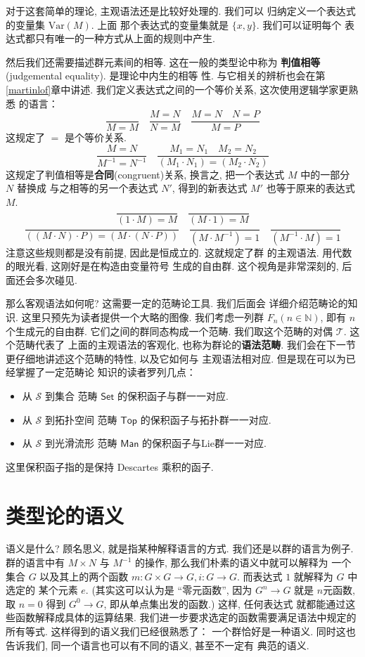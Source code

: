 对于这套简单的理论, 主观语法还是比较好处理的. 我们可以
归纳定义一个表达式的变量集 \(\mathrm{Var}(M)\). 上面
那个表达式的变量集就是 \(\{x, y\}\). 我们可以证明每个
表达式都只有唯一的一种方式从上面的规则中产生.

然后我们还需要描述群元素间的相等. 这在一般的类型论中称为%
\textbf{判值相等}(judgemental equality). 是理论中内生的相等
性. 与它相关的辨析也会在第\ref{martinlof}章中讲述.
我们定义表达式之间的一个等价关系, 这次使用逻辑学家更熟悉
的语言：
\[\frac{}{M = M}\quad
\frac{M = N}{N = M}\quad
\frac{M = N \quad N = P}{M = P}\]
这规定了 \(=\) 是个等价关系.
\[\frac{M = N}{M^{-1} = N^{-1}}\quad
\frac{M_1 = N_1\quad M_2 = N_2}
{(M_1 \cdot N_1) = (M_2 \cdot N_2)}\]
这规定了判值相等是\textbf{合同}(congruent)关系,
换言之, 把一个表达式 \(M\) 中的一部分 \(N\) 替换成
与之相等的另一个表达式 \(N'\), 得到的新表达式 \(M'\)
也等于原来的表达式 \(M\).
\[\frac{}{(1 \cdot M) = M}\quad
\frac{}{(M \cdot 1) = M}\]
\[\frac{}{((M \cdot N) \cdot P)
= (M \cdot (N \cdot P))} \quad
\frac{}{(M \cdot M^{-1}) = 1}\quad
\frac{}{(M^{-1} \cdot M) = 1}\]
注意这些规则都是没有前提, 因此是恒成立的. 这就规定了群
的主观语法. 用代数的眼光看, 这刚好是在构造由变量符号
生成的自由群. 这个视角是非常深刻的, 后面还会多次碰见.

那么客观语法如何呢? 这需要一定的范畴论工具. 我们后面会
详细介绍范畴论的知识. 这里只预先为读者提供一个大略的图像.
我们考虑一列群 \(F_n (n \in \mathbb N)\), 即有
\(n\) 个生成元的自由群. 它们之间的群同态构成一个范畴.
我们取这个范畴的对偶 \(\mathcal T\). 这个范畴代表了
上面的主观语法的客观化, 也称为群论的\textbf{语法范畴}.
我们会在下一节更仔细地讲述这个范畴的特性, 以及它如何与
主观语法相对应. 但是现在可以为已经掌握了一定范畴论
知识的读者罗列几点：
\begin{itemize}
\item 从 \(\mathcal S\) 到集合
范畴 \(\textsf{Set}\) 的保积函子与群一一对应.
\item 从 \(\mathcal S\) 到拓扑空间
范畴 \(\textsf{Top}\) 的保积函子与拓扑群一一对应.
\item 从 \(\mathcal S\) 到光滑流形
范畴 \(\textsf{Man}\) 的保积函子与Lie群一一对应.
\end{itemize}
这里保积函子指的是保持 Descartes 乘积的函子.

\section{类型论的语义}\label{intro:semantics}
语义是什么? 顾名思义, 就是指某种解释语言的方式.
我们还是以群的语言为例子. 群的语言中有 \(M\times N\)
与 \(M^{-1}\) 的操作, 那么我们朴素的语义中就可以解释为
一个集合 \(G\) 以及其上的两个函数 \(m : G\times G\to G,
i : G \to G\). 而表达式 \(1\) 就解释为 \(G\) 中选定的
某个元素 \(e\). (其实这可以认为是 “零元函数”, 因为
\(G^n \to G\) 就是 \(n\)元函数, 取 \(n = 0\) 得到
\(G^0 \to G\), 即从单点集出发的函数.) 这样, 任何表达式
就都能通过这些函数解释成具体的运算结果.
我们进一步要求选定的函数需要满足语法中规定的所有等式.
这样得到的语义我们已经很熟悉了： 一个群恰好是一种语义.
同时这也告诉我们, 同一个语言也可以有不同的语义, 甚至不一定有
典范的语义.

